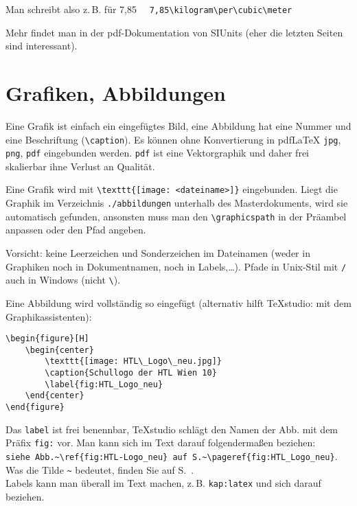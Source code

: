 			Man schreibt also z.\,B. für 7,85\kilogram\per\cubic\meter ~~ \verb"7,85\kilogram\per\cubic\meter"
			
			Mehr findet man in der pdf-Dokumentation von SIUnits (eher die letzten Seiten sind interessant).
						
			
	\section{Grafiken, Abbildungen}
		Eine Grafik ist einfach ein eingefügtes Bild, eine Abbildung hat eine Nummer und eine Beschriftung (\verb"\caption"). Es können ohne Konvertierung in pdf\LaTeX{} \verb"jpg", \verb"png", \verb"pdf" eingebunden werden. \verb"pdf" ist eine Vektorgraphik und daher frei skalierbar ihne Verlust an Qualität. 
		
		Eine Grafik wird mit \verb"\texttt{[image: <dateiname>]}" eingebunden. 
		Liegt die Graphik im Verzeichnis \verb"./abbildungen" unterhalb des Masterdokuments, wird sie automatisch gefunden, ansonsten muss man den \verb"\graphicspath" in der Präambel anpassen oder den Pfad angeben.
		
		Vorsicht: keine Leerzeichen und Sonderzeichen im Dateinamen (weder in Graphiken noch in Dokumentnamen, noch in Labels,\dots). Pfade in Unix-Stil mit \verb"/" auch in Windows (nicht \verb"\").
		
		Eine Abbildung wird vollständig so eingefügt (alternativ hilft TeXstudio: mit dem Graphikassistenten):

		\begin{verbatim}
\begin{figure}[H]
    \begin{center}
        \texttt{[image: HTL\_Logo\_neu.jpg]}
        \caption{Schullogo der HTL Wien 10}
        \label{fig:HTL_Logo_neu}
    \end{center}
\end{figure}
		\end{verbatim} 
		
		Das \verb"label" ist frei benennbar, TeXstudio schlägt den Namen der Abb. mit dem Präfix \verb"fig:" vor. Man kann sich im Text darauf folgendermaßen beziehen:\\ 
		\verb"siehe Abb.~\ref{fig:HTL-Logo_neu} auf S.~\pageref{fig:HTL_Logo_neu}".\\
		Was die Tilde \verb"~" bedeutet, finden Sie auf S.~\pageref{kap:tilde}.\\
		Labels kann man überall im Text machen, z.\,B. \verb"kap:latex" und sich darauf beziehen.
		
